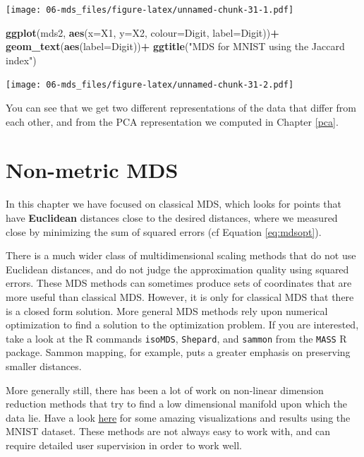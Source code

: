 \documentclass[]{book}
\newenvironment{Shaded}{\begin{snugshade}}{\end{snugshade}}
\newcommand{\DataTypeTok}[1]{\textcolor[rgb]{0.13,0.29,0.53}{#1}}
\newcommand{\KeywordTok}[1]{\textcolor[rgb]{0.13,0.29,0.53}{\textbf{#1}}}
\newcommand{\NormalTok}[1]{#1}
\newcommand{\OperatorTok}[1]{\textcolor[rgb]{0.81,0.36,0.00}{\textbf{#1}}}
\newcommand{\StringTok}[1]{\textcolor[rgb]{0.31,0.60,0.02}{#1}}
\theoremstyle{definition}
\theoremstyle{definition}
\theoremstyle{definition}
\theoremstyle{remark}
\begin{document}
\texttt{[image: 06-mds\_files/figure-latex/unnamed-chunk-31-1.pdf]}

\begin{Shaded}
\begin{Highlighting}[]
\KeywordTok{ggplot}\NormalTok{(mds2, }\KeywordTok{aes}\NormalTok{(}\DataTypeTok{x=}\NormalTok{X1, }\DataTypeTok{y=}\NormalTok{X2, }\DataTypeTok{colour=}\NormalTok{Digit, }\DataTypeTok{label=}\NormalTok{Digit))}\OperatorTok{+}
\StringTok{  }\KeywordTok{geom_text}\NormalTok{(}\KeywordTok{aes}\NormalTok{(}\DataTypeTok{label=}\NormalTok{Digit))}\OperatorTok{+}\StringTok{ }\KeywordTok{ggtitle}\NormalTok{(}\StringTok{"MDS for MNIST using the Jaccard index"}\NormalTok{) }
\end{Highlighting}
\end{Shaded}

\texttt{[image: 06-mds\_files/figure-latex/unnamed-chunk-31-2.pdf]}

You can see that we get two different representations of the data that differ from each other, and from the PCA representation we computed in Chapter \ref{pca}.

\hypertarget{non-metric-mds}{%
\section{Non-metric MDS}\label{non-metric-mds}}

In this chapter we have focused on classical MDS, which looks for points that have \textbf{Euclidean} distances close to the desired distances, where we measured close by minimizing the sum of squared errors (cf Equation \eqref{eq:mdsopt}).

There is a much wider class of multidimensional scaling methods that do not use Euclidean distances, and do not judge the approximation quality using squared errors. These MDS methods can sometimes produce sets of coordinates that are more useful than classical MDS. However, it is only for classical MDS that there is a closed form solution. More general MDS methods rely upon numerical optimization to find a solution to the optimization problem. If you are interested, take a look at the R commands \texttt{isoMDS}, \texttt{Shepard}, and \texttt{sammon} from the \texttt{MASS} R package. Sammon mapping, for example, puts a greater emphasis on preserving smaller distances.

More generally still, there has been a lot of work on non-linear dimension reduction methods that try to find a low dimensional manifold upon which the data lie. Have a look \href{https://colah.github.io/posts/2014-10-Visualizing-MNIST/}{here} for some amazing visualizations and results using the MNIST dataset. These methods are not always easy to work with, and can require detailed user supervision in order to work well.
\end{document}
